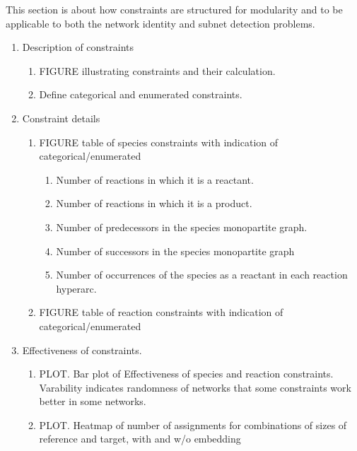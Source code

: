 \documentclass{article}
\begin{document}
This section is about how constraints are structured for modularity and to be applicable to both the network identity and subnet detection problems.
\begin{enumerate}
    \item Description of constraints

\begin{enumerate}
    \item FIGURE illustrating constraints and their calculation.
    \item Define categorical and enumerated constraints.
\end{enumerate}

\item Constraint details
\begin{enumerate}
    \item FIGURE table of species constraints with indication of categorical/enumerated
    \begin{enumerate}
            \item Number of reactions in which it is a reactant. 
            \item Number of reactions in which it is a product.
            \item Number of predecessors in the species monopartite graph.
            \item Number of successors in the species monopartite graph
            \item Number of occurrences of the species as a reactant in each reaction hyperarc.
    \end{enumerate}
    \item FIGURE table of reaction constraints with indication of categorical/enumerated
\end{enumerate}

\item Effectiveness of constraints.
\begin{enumerate}

\item PLOT. Bar plot of Effectiveness of species and reaction constraints. Varability indicates randomness of networks that some constraints work better in some networks.

 \item PLOT. Heatmap of number of assignments for combinations of sizes of reference and target, with and w/o embedding

\end{enumerate}

\end{enumerate}
    
\end{document}
